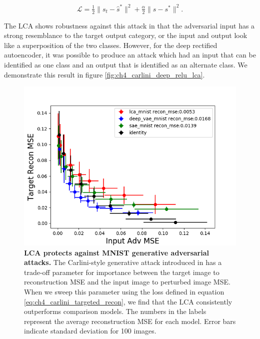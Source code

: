 \begin{equation}\label{eq:ch4_kos_carlini_attack}
    \mathcal{L} = \tfrac{1}{2} \|s_{t} - \hat{s}^{*}\|^{2} + \tfrac{\alpha}{2}\|s - s^{*}\|^{2}.
\end{equation}

The LCA shows robustness against this attack in that the adversarial input has a strong resemblance to the target output category, or the input and output look like a superposition of the two classes. However, for the deep rectified autoencoder, it was possible to produce an attack which had an input that can be identified as one class and an output that is identified as an alternate class. We demonstrate this result in figure \ref{fig:ch4_carlini_deep_relu_lca}.

\begin{figure}[h]
    \begin{center}
    \centerline{\includegraphics[width=\columnwidth]{figures/recon_mult_tradeoff.png}}
    \end{center}
    \caption{\textbf{LCA protects against MNIST generative adversarial attacks.} The Carlini-style generative attack introduced in \parencite{kos2018adversarial} has a trade-off parameter for importance between the target image to reconstruction MSE and the input image to perturbed image MSE. When we sweep this parameter using the loss defined in equation \eqref{eq:ch4_carlini_targeted_recon}, we find that the LCA consistently outperforms comparison models. The numbers in the labels represent the average reconstruction MSE for each model. Error bars indicate standard deviation for 100 images.}
    \label{fig:ch4_kos_generative_attack}
\end{figure}

